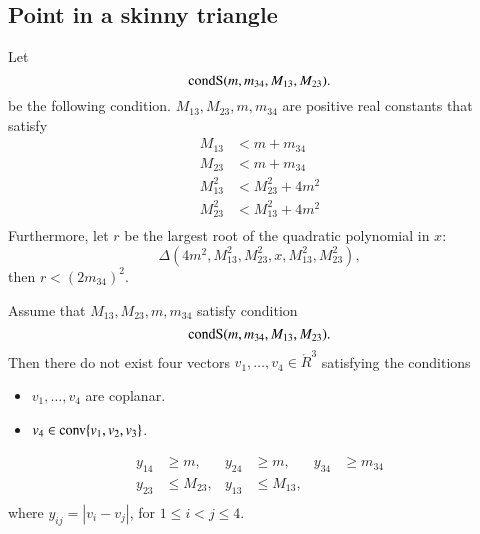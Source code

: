 \begin{tarskidata}
\begin{tarski}
\section{Point in a skinny triangle}

\begin{definition}[condS]
Let 
	$$
	{\operatorname{condS}}(m,m_{34},M_{13},M_{23}). 
	$$
be the following condition.
 $M_{13},M_{23},m,m_{34}$ are positive real constants
that satisfy 
	$$
	\begin{array}{rll}
		M_{13} &< m + m_{34}\\
		M_{23} &< m + m_{34}\\
		M_{13}^2 &< M_{23}^2 + 4m^2\\
		M_{23}^2 &< M_{13}^2 + 4m^2\\
	\end{array}
	$$
Furthermore, let $r$ be the largest root of the quadratic polynomial in $x$:
	$$\Delta(4m^2,M_{13}^2,M_{23}^2,x,M_{13}^2,M_{23}^2),$$
then $r < (2 m_{34})^2$.
\end{definition}
\end{tarski}




\begin{tarski}

\begin{lemma}
Assume that $M_{13},M_{23},m,m_{34}$ satisfy condition
   $${\operatorname{condS}}(m,m_{34},M_{13},M_{23}).$$
Then there do not exist four vectors
$v_1,\ldots,v_4\in\ring{R}^3$ satisfying the conditions
	\begin{itemize}
		\item $v_1,\ldots,v_4$ are coplanar.
		\item $v_4\in{\operatorname{conv}}\{v_1,v_2,v_3\}$.
	\end{itemize}
	$$
	\begin{array}{rlrlrl}
		y_{14} &\ge m, &y_{24} &\ge m, &y_{34}&\ge m_{34}\\
		y_{23} &\le  M_{23}, &y_{13} & \le M_{13}, &\\
	\end{array}
	$$
where
$y_{ij}=|v_i-v_j|$,
for $1\le i < j \le 4$.  
\end{lemma}


\end{tarski}
\end{tarskidata}
